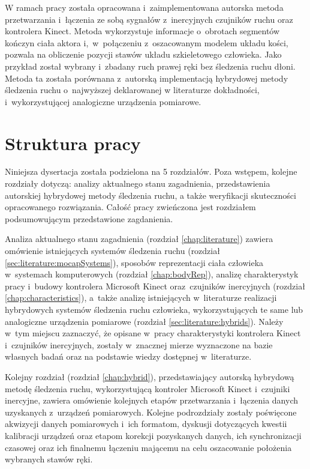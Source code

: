 W ramach pracy została opracowana i~zaimplementowana autorska metoda przetwarzania i~łączenia ze sobą sygnałów z~inercyjnych czujników ruchu oraz kontrolera Kinect. Metoda wykorzystuje informacje o~obrotach segmentów kończyn ciała aktora i,~w~połączeniu z~oszacowanym modelem układu kości, pozwala na obliczenie pozycji stawów układu szkieletowego człowieka. 
Jako przykład został wybrany i~zbadany ruch prawej ręki bez śledzenia ruchu dłoni. Metoda ta została porównana z~autorską implementacją hybrydowej metody śledzenia ruchu o~najwyższej deklarowanej w literaturze dokładności, i~wykorzystującej analogiczne urządzenia pomiarowe.\\

\section{Struktura pracy}
Niniejsza dysertacja została podzielona na 5 rozdziałów. Poza wstępem, kolejne rozdziały dotyczą: analizy aktualnego stanu zagadnienia, przedstawienia autorskiej hybrydowej metody śledzenia ruchu, a także weryfikacji skuteczności opracowanego rozwiązania. Całość pracy zwieńczona jest rozdziałem podsumowującym przedstawione zagdanienia. 

Analiza aktualnego stanu zagadnienia (rozdział \ref{chap:literature}) zawiera omówienie istniejących systemów śledzenia ruchu (rozdział \ref{sec:literature:mocapSystems}), sposobów reprezentacji ciała człowieka w~systemach komputerowych (rozdział \ref{chap:bodyRep}), analizę charakterystyk pracy i~budowy kontrolera Microsoft Kinect oraz~czujników inercyjnych (rozdział \ref{chap:characteristics}), a~także analizę istniejących w~literaturze realizacji hybrydowych systemów śledzenia ruchu człowieka, wykorzystujących te same lub analogiczne urządzenia pomiarowe (rozdział \ref{sec:literature:hybrids}). Należy w~tym miejscu zaznaczyć, że opisane w~pracy charakterystyki kontrolera Kinect i~czujników inercyjnych, zostały w~znacznej mierze wyznaczone na bazie własnych badań oraz na podstawie wiedzy dostępnej w~literaturze.

Kolejny rozdział (rozdział \ref{chap:hybrid}), przedstawiający autorską hybrydową metodę śledzenia ruchu, wykorzystującą kontroler Microsoft Kinect i~czujniki inercyjne, zawiera omówienie kolejnych etapów przetwarzania i~łączenia danych uzyskanych z~urządzeń pomiarowych. Kolejne podrozdziały zostały poświęcone akwizycji danych pomiarowych i~ich formatom, dyskusji dotyczących kwestii kalibracji urządzeń oraz etapom korekcji pozyskanych danych, ich synchronizacji czasowej oraz ich finalnemu łączeniu mającemu na celu oszacowanie położenia wybranych stawów ręki. 


